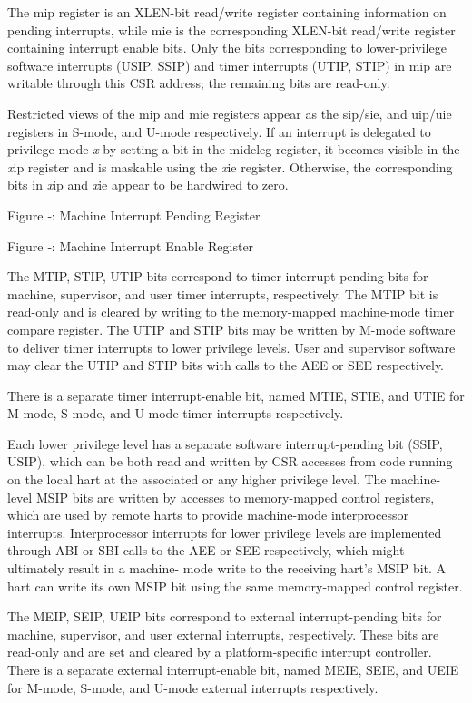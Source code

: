 The mip register is an XLEN-bit read/write register containing
information on pending interrupts, while mie is the corresponding
XLEN-bit read/write register containing interrupt enable bits. Only the
bits corresponding to lower-privilege software interrupts (USIP, SSIP)
and timer interrupts (UTIP, STIP) in mip are writable through this CSR
address; the remaining bits are read-only.

Restricted views of the mip and mie registers appear as the sip/sie, and
uip/uie registers in S-mode, and U-mode respectively. If an interrupt is
delegated to privilege mode \emph{x} by setting a bit in the mideleg
register, it becomes visible in the \emph{x}ip register and is maskable
using the \emph{x}ie register. Otherwise, the corresponding bits in
\emph{x}ip and \emph{x}ie appear to be hardwired to zero.

\missingfigure{}

Figure ‑: Machine Interrupt Pending Register

\missingfigure{}
Figure ‑: Machine Interrupt Enable Register

The MTIP, STIP, UTIP bits correspond to timer interrupt-pending bits for
machine, supervisor, and user timer interrupts, respectively. The MTIP
bit is read-only and is cleared by writing to the memory-mapped
machine-mode timer compare register. The UTIP and STIP bits may be
written by M-mode software to deliver timer interrupts to lower
privilege levels. User and supervisor software may clear the UTIP and
STIP bits with calls to the AEE or SEE respectively.

There is a separate timer interrupt-enable bit, named MTIE, STIE, and
UTIE for M-mode, S-mode, and U-mode timer interrupts respectively.

Each lower privilege level has a separate software interrupt-pending bit
(SSIP, USIP), which can be both read and written by CSR accesses from
code running on the local hart at the associated or any higher privilege
level. The machine-level MSIP bits are written by accesses to
memory-mapped control registers, which are used by remote harts to
provide machine-mode interprocessor interrupts. Interprocessor
interrupts for lower privilege levels are implemented through ABI or SBI
calls to the AEE or SEE respectively, which might ultimately result in a
machine- mode write to the receiving hart's MSIP bit. A hart can write
its own MSIP bit using the same memory-mapped control register.

The MEIP, SEIP, UEIP bits correspond to external interrupt-pending bits
for machine, supervisor, and user external interrupts, respectively.
These bits are read-only and are set and cleared by a platform-specific
interrupt controller. There is a separate external interrupt-enable bit,
named MEIE, SEIE, and UEIE for M-mode, S-mode, and U-mode external
interrupts respectively.

